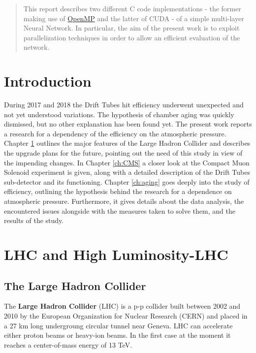 \documentclass[12pt,twoside,a4paper]{report}
\numberwithin{equation}{section}
\begin{document}
\hypersetup{pageanchor=false}

\newpage\null\thispagestyle{empty}\newpage
\begin{abstract}
This report describes two different C code implementations - the former making use of \href{https://www.openmp.org/}{OpenMP} and the latter of CUDA - of a simple multi-layer Neural Network. In particular, the aim of the present work is to exploit parallelization techniques in order to allow an efficient evaluation of the network.

\end{abstract}
\newpage\null\thispagestyle{empty}\newpage
\tableofcontents

\newpage\null\thispagestyle{empty}\newpage
{}
\chapter*{Introduction}
During 2017 and 2018 the Drift Tubes hit efficiency underwent unexpected and not yet understood variations. The hypothesis of chamber aging was quickly dismissed, but no other explanation has been found yet.
The present work reports a research for a dependency of the efficiency on the atmospheric pressure.
Chapter \ref{ch:LHC} outlines the major features of the Large Hadron Collider and describes the upgrade plans for the future, pointing out the need of this study in view of the impending changes.
In Chapter \ref{ch:CMS} a closer look at the Compact Muon Solenoid experiment is given, along with a detailed description of the Drift Tubes sub-detector and its functioning.
Chapter \ref{ch:aging} goes deeply into the study of efficiency, outlining the hypothesis behind the research for a dependence on atmospheric pressure. Furthermore, it gives details about the data analysis, the encountered issues alongside with the measures taken to solve them, and the results of the study.


\newpage\null\thispagestyle{empty}\newpage
\chapter{LHC and High Luminosity-LHC}
\label{ch:LHC}
\section{The Large Hadron Collider}

The \textbf{Large Hadron Collider} (LHC) is a p-p collider built between 2002 and 2010 by the European Organization for Nuclear Research (CERN) and placed in a 27 km long undergroung circular tunnel near Geneva.
LHC can accelerate either proton beams or heavy-ion beams. In the first case at the moment it reaches a center-of-mass energy of 13 TeV. 
\end{document}
